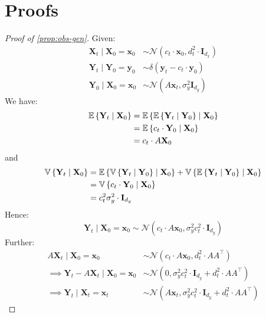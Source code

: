 \newpage

\section{Proofs}\label{sec:proofs}

\begin{proof}[Proof of \autoref{prop:obs-gen}] \label{prf:obs-generation}
    Given:
    \begin{align*}
        \mathbf{X}_t \mid \mathbf{X}_0 = \mathbf{x}_0 &\sim \mathcal{N}(c_t\cdot\mathbf{x}_0, d_t^2\cdot\mathbf{I}_{d_x}) \\
        \mathbf{Y}_t \mid \mathbf{Y}_0 = \mathbf{y}_0 &\sim \delta(\mathbf{y}_t - c_t\cdot \mathbf{y}_0) \\
        \mathbf{Y}_0 \mid \mathbf{X}_0 = \mathbf{x}_0 &\sim \mathcal{N}(A\mathbf{x}_t, \sigma_y^2\mathbf{I}_{d_y})
    \end{align*}
    We have:
    \begin{align*}
        \mathbb{E} \left\{ \mathbf{Y}_t \mid \mathbf{X}_0 \right\} &= \mathbb{E} \left\{ \mathbb{E} \left\{ \mathbf{Y}_t \mid \mathbf{Y}_0 \right\} \mid \mathbf{X}_0 \right\} \\
        &= \mathbb{E} \left\{ c_t\cdot \mathbf{Y}_0 \mid \mathbf{X}_0 \right\} \\
        &= c_t\cdot A\mathbf{X}_0
    \end{align*}
    and
    \begin{align*}
        \mathbb{V} \left\{ \mathbf{Y}_t \mid \mathbf{X}_0 \right\} &= \mathbb{E} \left\{ \mathbb{V} \left\{ \mathbf{Y}_t \mid \mathbf{Y}_0 \right\} \mid \mathbf{X}_0 \right\} + \mathbb{V} \left\{ \mathbb{E} \left\{ \mathbf{Y}_t \mid \mathbf{Y}_0 \right\} \mid \mathbf{X}_0 \right\} \\
        &= \mathbb{V} \left\{ c_t\cdot \mathbf{Y}_0 \mid \mathbf{X}_0 \right\} \\
        &= c_t^2\sigma_y^2\cdot \mathbf{I}_{d_y}
    \end{align*}
    Hence:
    \begin{equation*}
        \mathbf{Y}_t \mid \mathbf{X}_0 = \mathbf{x}_0 \sim \mathcal{N}(c_t\cdot A\mathbf{x}_0, \sigma_y^2c_t^2\cdot \mathbf{I}_{d_y})
    \end{equation*}
    Further:
    \begin{align*}
        A\mathbf{X}_t \mid \mathbf{X}_0 = \mathbf{x}_0 &\sim \mathcal{N}(c_t\cdot A\mathbf{x}_0, d_t^2\cdot AA^\top) \\
        \implies \mathbf{Y}_t - A\mathbf{X}_t \mid \mathbf{X}_0 = \mathbf{x}_0 &\sim \mathcal{N}(0, \sigma_y^2c_t^2\cdot \mathbf{I}_{d_y} + d_t^2\cdot AA^\top) \\
        \implies \mathbf{Y}_t \mid \mathbf{X}_t = \mathbf{x}_t &\sim \mathcal{N}(A\mathbf{x}_t, \sigma_y^2c_t^2\cdot \mathbf{I}_{d_y} + d_t^2\cdot AA^\top)
    \end{align*}

\end{proof}

